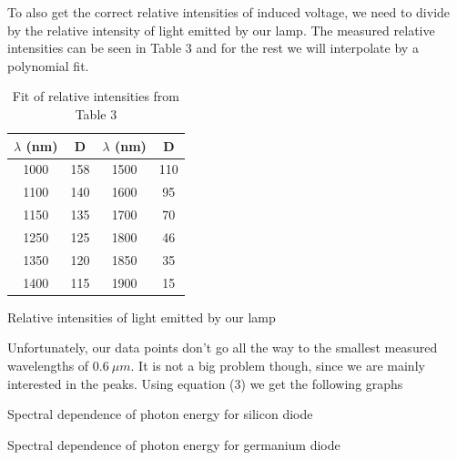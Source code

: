 \documentclass[a4paper,11pt]{article}
\begin{document}
To also get the correct relative intensities of induced voltage, we need to divide by the relative intensity of light emitted by our lamp. The measured relative intensities can be seen in Table 3 and for the rest we will interpolate by a polynomial fit.

\begin{table}[htpb]
    \begin{minipage}[b]{.45\linewidth}
        \centering
        \begin{tabular}{c c c c}
            $ \lambda $ (nm) & D & $ \lambda $ (nm) & D \\ 
            \hline\hline
            1000 & 158 & 1500 & 110 \\
            1100 & 140 & 1600 & 95 \\
            1150 & 135 & 1700 & 70 \\
            1250 & 125 & 1800 & 46 \\
            1350 & 120 & 1850 & 35 \\
            1400 & 115 & 1900 & 15 \\
        \end{tabular}
        \caption{Relative intensities of light emitted by our lamp}

    \end{minipage} 
    \hfill
    \begin{minipage}[b]{.49\linewidth}
        \centering
        \resizebox{\textwidth}{!}{  }
        \captionsetup{type=graph}
        \caption{Fit of relative intensities from Table 3}
    \end{minipage} 
\end{table}

Unfortunately, our data points don't go all the way to the smallest measured wavelengths of $ 0.6 \ \mu m $. It is not a big problem though, since we are mainly interested in the peaks. Using equation (3) we get the following graphs

\begin{table}[htpb]
    \begin{minipage}[b]{.45\linewidth}
        \centering
        \resizebox{\textwidth}{!}{  }
        \captionsetup{type=graph}
        \caption{Spectral dependence of photon energy for silicon diode }
    \end{minipage} 
    \hfill
    \begin{minipage}[b]{.45\linewidth}
        \centering
        \resizebox{\textwidth}{!}{  }
        \captionsetup{type=graph}
        \caption{Spectral dependence of photon energy for germanium diode }
    \end{minipage} 
\end{table}
\end{document}
